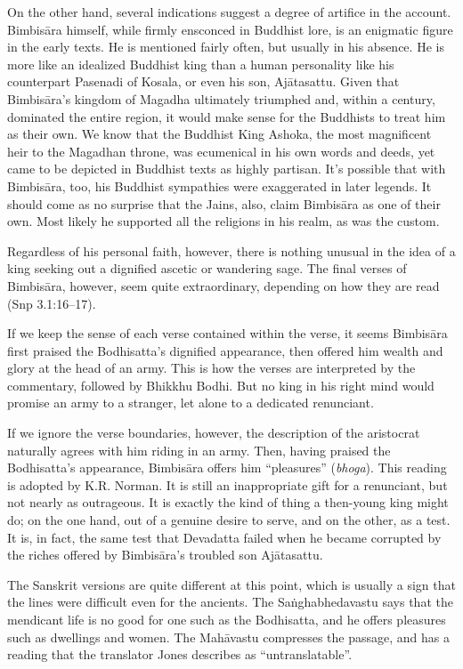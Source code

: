 \documentclass[12pt,openany]{book}%
\begin{document}
On the other hand, several indications suggest a degree of artifice in the account. \textsanskrit{Bimbisāra} himself, while firmly ensconced in Buddhist lore, is an enigmatic figure in the early texts. He is mentioned fairly often, but usually in his absence. He is more like an idealized Buddhist king than a human personality like his counterpart Pasenadi of Kosala, or even his son, \textsanskrit{Ajātasattu}. Given that \textsanskrit{Bimbisāra}’s kingdom of Magadha ultimately triumphed and, within a century, dominated the entire region, it would make sense for the Buddhists to treat him as their own. We know that the Buddhist King Ashoka, the most magnificent heir to the Magadhan throne, was ecumenical in his own words and deeds, yet came to be depicted in Buddhist texts as highly partisan. It’s possible that with \textsanskrit{Bimbisāra}, too, his Buddhist sympathies were exaggerated in later legends. It should come as no surprise that the Jains, also, claim \textsanskrit{Bimbisāra} as one of their own. Most likely he supported all the religions in his realm, as was the custom.

Regardless of his personal faith, however, there is nothing unusual in the idea of a king seeking out a dignified ascetic or wandering sage. The final verses of \textsanskrit{Bimbisāra}, however, seem quite extraordinary, depending on how they are read (Snp 3.1:16–17).

If we keep the sense of each verse contained within the verse, it seems \textsanskrit{Bimbisāra} first praised the Bodhisatta’s dignified appearance, then offered him wealth and glory at the head of an army. This is how the verses are interpreted by the commentary, followed by Bhikkhu Bodhi. But no king in his right mind would promise an army to a stranger, let alone to a dedicated renunciant.

If we ignore the verse boundaries, however, the description of the aristocrat naturally agrees with him riding in an army. Then, having praised the Bodhisatta’s appearance, \textsanskrit{Bimbisāra} offers him “pleasures” (\textit{bhoga}). This reading is adopted by K.R. Norman. It is still an inappropriate gift for a renunciant, but not nearly as outrageous. It is exactly the kind of thing a then-young king might do; on the one hand, out of a genuine desire to serve, and on the other, as a test. It is, in fact, the same test that Devadatta failed when he became corrupted by the riches offered by \textsanskrit{Bimbisāra}’s troubled son \textsanskrit{Ajātasattu}.

The Sanskrit versions are quite different at this point, which is usually a sign that the lines were difficult even for the ancients. The \textsanskrit{Saṅghabhedavastu} says that the mendicant life is no good for one such as the Bodhisatta, and he offers pleasures such as dwellings and women. The \textsanskrit{Mahāvastu} compresses the passage, and has a reading that the translator Jones describes as “untranslatable”.
\end{document}
